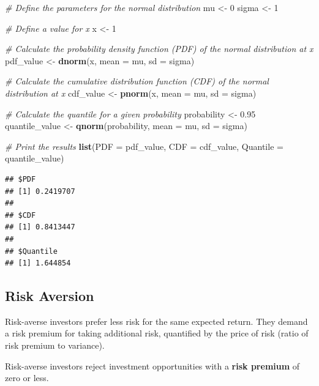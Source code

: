 \documentclass[
]{book}
\newenvironment{Shaded}{\begin{snugshade}}{\end{snugshade}}
\newcommand{\AttributeTok}[1]{\textcolor[rgb]{0.13,0.29,0.53}{#1}}
\newcommand{\CommentTok}[1]{\textcolor[rgb]{0.56,0.35,0.01}{\textit{#1}}}
\newcommand{\DecValTok}[1]{\textcolor[rgb]{0.00,0.00,0.81}{#1}}
\newcommand{\FloatTok}[1]{\textcolor[rgb]{0.00,0.00,0.81}{#1}}
\newcommand{\FunctionTok}[1]{\textcolor[rgb]{0.13,0.29,0.53}{\textbf{#1}}}
\newcommand{\NormalTok}[1]{#1}
\newcommand{\OtherTok}[1]{\textcolor[rgb]{0.56,0.35,0.01}{#1}}
\begin{document}
\begin{Shaded}
\begin{Highlighting}[]
\CommentTok{\# Define the parameters for the normal distribution}
\NormalTok{mu }\OtherTok{\textless{}{-}} \DecValTok{0}
\NormalTok{sigma }\OtherTok{\textless{}{-}} \DecValTok{1}

\CommentTok{\# Define a value for x}
\NormalTok{x }\OtherTok{\textless{}{-}} \DecValTok{1}

\CommentTok{\# Calculate the probability density function (PDF) of the normal distribution at x}
\NormalTok{pdf\_value }\OtherTok{\textless{}{-}} \FunctionTok{dnorm}\NormalTok{(x, }\AttributeTok{mean =}\NormalTok{ mu, }\AttributeTok{sd =}\NormalTok{ sigma)}

\CommentTok{\# Calculate the cumulative distribution function (CDF) of the normal distribution at x}
\NormalTok{cdf\_value }\OtherTok{\textless{}{-}} \FunctionTok{pnorm}\NormalTok{(x, }\AttributeTok{mean =}\NormalTok{ mu, }\AttributeTok{sd =}\NormalTok{ sigma)}

\CommentTok{\# Calculate the quantile for a given probability}
\NormalTok{probability }\OtherTok{\textless{}{-}} \FloatTok{0.95}
\NormalTok{quantile\_value }\OtherTok{\textless{}{-}} \FunctionTok{qnorm}\NormalTok{(probability, }\AttributeTok{mean =}\NormalTok{ mu, }\AttributeTok{sd =}\NormalTok{ sigma)}

\CommentTok{\# Print the results}
\FunctionTok{list}\NormalTok{(}\AttributeTok{PDF =}\NormalTok{ pdf\_value, }\AttributeTok{CDF =}\NormalTok{ cdf\_value, }\AttributeTok{Quantile =}\NormalTok{ quantile\_value)}
\end{Highlighting}
\end{Shaded}

\begin{verbatim}
## $PDF
## [1] 0.2419707
## 
## $CDF
## [1] 0.8413447
## 
## $Quantile
## [1] 1.644854
\end{verbatim}

\hypertarget{risk-aversion}{%
\subsection{Risk Aversion}\label{risk-aversion}}

Risk-averse investors prefer less risk for the same expected return. They demand a risk premium for taking additional risk, quantified by the price of risk (ratio of risk premium to variance).

Risk-averse investors reject investment opportunities with a \textbf{risk premium} of zero or less.
\end{document}

